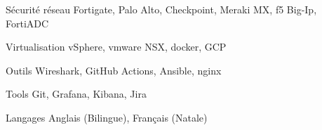 

\begin{cvskills}

  \cvskill
    {Sécurité réseau} %
    {Fortigate, Palo Alto, Checkpoint, Meraki MX, f5 Big-Ip, FortiADC} %

  \cvskill
    {Virtualisation} %
    {vSphere, vmware NSX, docker, GCP} %

  \cvskill
    {Outils} %
    {Wireshark, GitHub Actions, Ansible, nginx} %

  \cvskill
    {Tools} %
    {Git, Grafana, Kibana, Jira} %

  \cvskill
    {Langages} %
    {Anglais (Bilingue), Français (Natale)} %

\end{cvskills}
